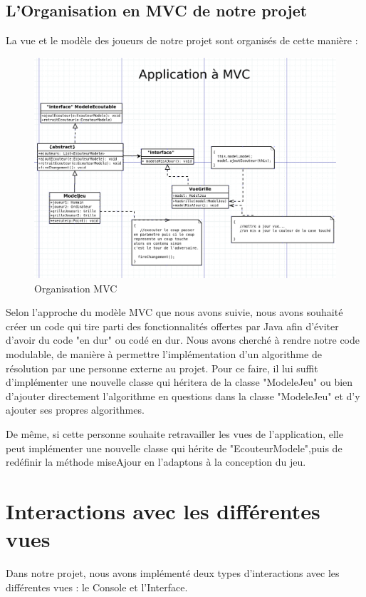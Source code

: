 \documentclass{rapport}
\begin{document}
{\subsection{L'Organisation en MVC de notre projet}
La vue et le modèle des joueurs de notre projet sont organisés de cette manière :\\
\begin{figure}[h]
\centering
\includegraphics[scale=0.3]{images/MVC.png}
\caption{Organisation MVC}
\end{figure}
Selon l'approche du modèle MVC que nous avons suivie, nous avons souhaité créer un code qui tire parti des fonctionnalités offertes par Java afin d'éviter d'avoir du code "en dur" ou codé en dur. Nous avons cherché à rendre notre code modulable, de manière à permettre l'implémentation d'un algorithme de résolution par une personne externe au projet. Pour ce faire, il lui suffit d'implémenter une nouvelle classe qui héritera de la classe "ModeleJeu" ou bien d'ajouter directement l'algorithme en questions dans la classe "ModeleJeu" et d'y ajouter ses propres algorithmes.

De même, si cette personne souhaite retravailler les vues de l'application, elle peut implémenter une nouvelle classe qui hérite de "EcouteurModele",puis de redéfinir la méthode miseAjour en l'adaptons à la conception du jeu.
\section{Interactions avec les différentes vues }
Dans notre projet, nous avons implémenté deux types d'interactions avec les différentes vues : le Console et l'Interface.





}
\end{document}
